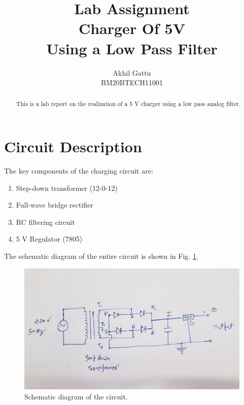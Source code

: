 \documentclass[journal,12pt,twocolumn]{IEEEtran}
\begin{document}
\let\StandardTheFigure\thefigure
\renewcommand{\thefigure}{\arabic{section}.\arabic{figure}}
\makeatletter
{}
\makeatother


\def\putbox#1#2#3{\makebox[0in][l]{\makebox[#1][l]{}\raisebox{\baselineskip}[0in][0in]{\raisebox{#2}[0in][0in]{#3}}}}
     \def\rightbox#1{\makebox[0in][r]{#1}}
     \def\centbox#1{\makebox[0in]{#1}}
     \def\topbox#1{\raisebox{-\baselineskip}[0in][0in]{#1}}
     \def\midbox#1{\raisebox{-0.5\baselineskip}[0in][0in]{#1}}

\vspace{3cm}

\title{Lab Assignment\\Charger Of 5V\\ Using a Low Pass Filter}
\author{Akhil Gattu\\BM20BTECH11001}
\maketitle
\tableofcontents
\renewcommand{\thetable}{\theenumi}
\bigskip
\begin{abstract}
    This is a lab report on the realization of a 5 V charger using
    a low pass analog filter.
\end{abstract}
\section{Circuit Description}
The key components of the charging circuit are:
\begin{enumerate}
    \item Step-down transformer (12-0-12)
    \item Full-wave bridge rectifier
    \item RC filtering circuit
    \item 5 V Regulator (7805)
\end{enumerate}

The schematic diagram of the entire circuit is shown in Fig. \ref{fig:ckt}.
\begin{figure}[!htb]
    \includegraphics[width=\columnwidth]{figs/circuit.jpg}
    \caption{Schematic diagram of the circuit.}
    \label{fig:ckt} 
\end{figure}
\end{document}
